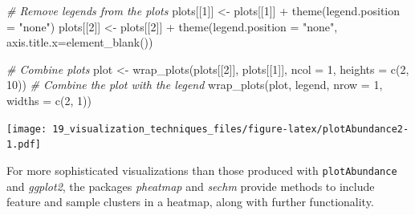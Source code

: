 \documentclass[
]{book}
\newenvironment{Shaded}{\begin{snugshade}}{\end{snugshade}}
\newcommand{\AttributeTok}[1]{\textcolor[rgb]{0.77,0.63,0.00}{#1}}
\newcommand{\CommentTok}[1]{\textcolor[rgb]{0.56,0.35,0.01}{\textit{#1}}}
\newcommand{\DecValTok}[1]{\textcolor[rgb]{0.00,0.00,0.81}{#1}}
\newcommand{\FunctionTok}[1]{\textcolor[rgb]{0.00,0.00,0.00}{#1}}
\newcommand{\NormalTok}[1]{#1}
\newcommand{\OtherTok}[1]{\textcolor[rgb]{0.56,0.35,0.01}{#1}}
\newcommand{\SpecialCharTok}[1]{\textcolor[rgb]{0.00,0.00,0.00}{#1}}
\newcommand{\StringTok}[1]{\textcolor[rgb]{0.31,0.60,0.02}{#1}}
\begin{document}
\begin{Shaded}
\begin{Highlighting}[]
\CommentTok{\# Remove legends from the plots}
\NormalTok{plots[[}\DecValTok{1}\NormalTok{]] }\OtherTok{\textless{}{-}}\NormalTok{ plots[[}\DecValTok{1}\NormalTok{]] }\SpecialCharTok{+} \FunctionTok{theme}\NormalTok{(}\AttributeTok{legend.position =} \StringTok{"none"}\NormalTok{)}
\NormalTok{plots[[}\DecValTok{2}\NormalTok{]] }\OtherTok{\textless{}{-}}\NormalTok{ plots[[}\DecValTok{2}\NormalTok{]] }\SpecialCharTok{+} \FunctionTok{theme}\NormalTok{(}\AttributeTok{legend.position =} \StringTok{"none"}\NormalTok{, }\AttributeTok{axis.title.x=}\FunctionTok{element\_blank}\NormalTok{()) }

\CommentTok{\# Combine plots}
\NormalTok{plot }\OtherTok{\textless{}{-}} \FunctionTok{wrap\_plots}\NormalTok{(plots[[}\DecValTok{2}\NormalTok{]], plots[[}\DecValTok{1}\NormalTok{]], }\AttributeTok{ncol =} \DecValTok{1}\NormalTok{, }\AttributeTok{heights =} \FunctionTok{c}\NormalTok{(}\DecValTok{2}\NormalTok{, }\DecValTok{10}\NormalTok{))}
\CommentTok{\# Combine the plot with the legend}
\FunctionTok{wrap\_plots}\NormalTok{(plot, legend, }\AttributeTok{nrow =} \DecValTok{1}\NormalTok{, }\AttributeTok{widths =} \FunctionTok{c}\NormalTok{(}\DecValTok{2}\NormalTok{, }\DecValTok{1}\NormalTok{))}
\end{Highlighting}
\end{Shaded}

\texttt{[image: 19\_visualization\_techniques\_files/figure-latex/plotAbundance2-1.pdf]}

For more sophisticated visualizations than those produced with \texttt{plotAbundance}
and \emph{ggplot2}, the packages \emph{pheatmap} and \emph{sechm} provide methods to include
feature and sample clusters in a heatmap, along with further functionality.
\end{document}
